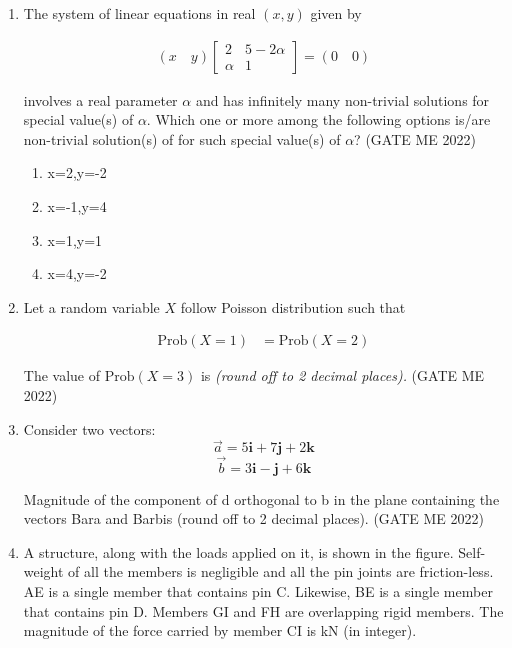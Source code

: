 \documentclass[journal]{IEEEtran}
\numberwithin{equation}{enumi}
\numberwithin{figure}{enumi}
\begin{document}
\begin{enumerate}
\item The system of linear equations in real \((x, y)\) given by

\begin{align}
    (x \quad y)
    \begin{bmatrix}
        2 & 5 - 2\alpha \\
        \alpha & 1
    \end{bmatrix}
    = (0 \quad 0)
\end{align}

involves a real parameter \(\alpha\) and has infinitely many non-trivial solutions for special value(s) of \(\alpha\). Which one or more among the following options is/are non-trivial solution(s) of  for such special value(s) of \(\alpha\)?
\hfill{(GATE ME 2022)}
\begin{enumerate}
    
    \item  x=2,y=-2
    \item x=-1,y=4
    \item x=1,y=1
    \item x=4,y=-2
\end{enumerate}

 \item 

Let a random variable \(X\) follow Poisson distribution such that

\begin{align}
    \text{Prob}(X = 1) &= \text{Prob}(X = 2)
\end{align}

The value of \(\text{Prob}(X = 3)\) is  \textit{(round off to 2 decimal places).}
\hfill{(GATE ME 2022)}
\item Consider two vectors:
  \[
\vec{a} = 5\mathbf{i} + 7\mathbf{j} + 2\mathbf{k}
\]
\[
\vec{b} = 3\mathbf{i} - \mathbf{j} + 6\mathbf{k}
\]

Magnitude of the component of d orthogonal to b in the plane containing the vectors Bar{a} and Bar{b}is
(round off to 2 decimal places).
\hfill{(GATE ME 2022)}
\item 
A structure, along with the loads applied on it, is shown in the figure. Self-weight of all the members is negligible and all the pin joints are friction-less. AE is a single member that contains pin C. Likewise, BE is a single member that contains pin D. Members GI and FH are overlapping rigid members. The magnitude of the force
carried by member CI is kN (in integer).


\end{enumerate}
\end{document}
